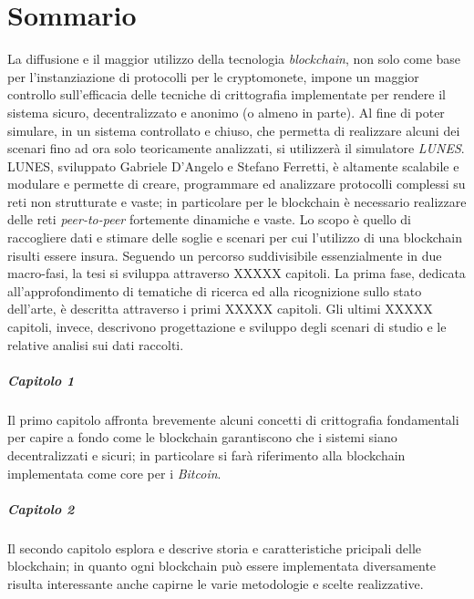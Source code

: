 \chapter{Sommario}
La diffusione e il maggior utilizzo della tecnologia \textit{blockchain}, non solo come base per l'instanziazione di protocolli per le cryptomonete, impone un maggior controllo sull'efficacia delle tecniche di crittografia implementate per rendere il sistema sicuro, decentralizzato e anonimo (o almeno in parte).
Al fine di poter simulare, in un sistema controllato e chiuso, che permetta di realizzare alcuni dei scenari fino ad ora solo teoricamente analizzati, si utilizzerà il simulatore \textit{LUNES}\cite{gdalunes}.\newline
LUNES, sviluppato Gabriele D'Angelo e Stefano Ferretti, è altamente scalabile e modulare e permette di creare, programmare ed analizzare protocolli complessi su reti non strutturate e vaste; in particolare per le blockchain è necessario realizzare delle reti \textit{peer-to-peer} fortemente dinamiche e vaste.\newline
Lo scopo è quello di raccogliere dati e stimare delle soglie e scenari per cui l'utilizzo di una blockchain risulti essere insura.\newline\newline
Seguendo un percorso suddivisibile essenzialmente in due macro-fasi, la tesi si sviluppa attraverso XXXXX capitoli. La prima fase, dedicata all'approfondimento di tematiche di ricerca ed alla ricognizione sullo stato dell'arte, è descritta attraverso i primi XXXXX capitoli. Gli ultimi XXXXX capitoli, invece, descrivono progettazione e sviluppo degli scenari di studio e le relative analisi sui dati raccolti.

\paragraph{Capitolo 1}
Il primo capitolo affronta brevemente alcuni concetti di crittografia fondamentali per capire a fondo come le blockchain garantiscono che i sistemi siano decentralizzati e sicuri; in particolare si farà riferimento alla blockchain implementata come core per i \textit{Bitcoin}.

\paragraph{Capitolo 2}
Il secondo capitolo esplora e descrive storia e caratteristiche pricipali delle blockchain; in quanto ogni blockchain può essere implementata diversamente risulta interessante anche capirne le varie metodologie e scelte realizzative.

